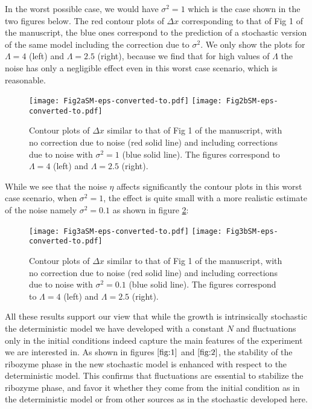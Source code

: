 \documentclass[twocolumn,showpacs,floatfix]{revtex4-1}
\begin{document}
\begin{thebibliography}{99}
\begin{widetext}
In the worst possible case, we would have $\sigma^2=1$ which is the case shown in the two figures below. 
The red contour plots of $\Delta x$ corresponding to that of Fig 1 of the manuscript, the blue ones
 correspond to the prediction of a stochastic version of the same model including the correction 
due to $\sigma^2$.
We only show the plots for $\Lambda=4$ (left) and $\Lambda=2.5$ (right), because we find that for 
high values of $\Lambda$ the noise has only a negligible effect even in this worst case scenario,
which is reasonable.
\begin{figure}[!htb]
\begin{center}
\texttt{[image: Fig2aSM-eps-converted-to.pdf]}
\texttt{[image: Fig2bSM-eps-converted-to.pdf]}
\end{center}
\caption{Contour plots of $\Delta x$ similar to that of Fig 1 of the manuscript, with no correction 
due to noise (red solid line) and 
including corrections due to noise with $\sigma^2=1$ (blue solid line). 
The figures correspond to $\Lambda=4$ (left) and $\Lambda=2.5$ (right).}
\label{fig:1}
\end{figure}
While we see that the noise $\eta$ affects significantly the contour plots in this worst case scenario, 
when $\sigma^2=1$, the effect is quite small with a more realistic estimate of the noise
namely $\sigma^2=0.1$ as shown in figure \ref{fig:2}:
\begin{figure}[!htb]
\begin{center}
\texttt{[image: Fig3aSM-eps-converted-to.pdf]}
\texttt{[image: Fig3bSM-eps-converted-to.pdf]}
\end{center}
\caption{Contour plots of $\Delta x$ similar to that of Fig 1 of the manuscript, with no correction 
due to noise (red solid line) and 
including corrections due to noise with $\sigma^2=0.1$ (blue solid line). 
The figures correspond to 
$\Lambda=4$ (left) and $\Lambda=2.5$ (right).}
\label{fig:2}
\end{figure}



All these results support our view that while the growth is intrinsically stochastic the deterministic 
model we have developed with a constant $N$ and 
fluctuations only in the initial conditions  
indeed capture the main features of the experiment we are interested in. 
As shown in figures $\ref{fig:1}$ and $\ref{fig:2}$, the stability of the ribozyme phase 
in the new stochastic model is enhanced with respect to the deterministic model. 
This confirms that fluctuations are essential to stabilize the ribozyme phase, and favor it whether they
 come from the initial condition as in the deterministic model or from other sources as in the stochastic developed here. 


\end{widetext}
\end{thebibliography}
\end{document}

